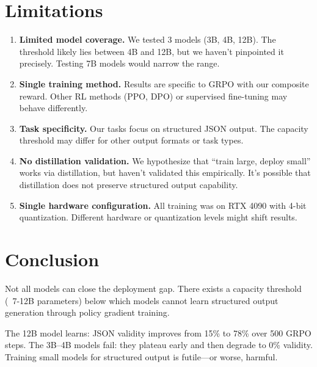 \documentclass[11pt]{article}
\begin{document}
\section{Limitations}
\label{sec:limitations}

\begin{enumerate}[leftmargin=12pt]
    \item \textbf{Limited model coverage.} We tested 3 models (3B, 4B, 12B). The threshold likely lies between 4B and 12B, but we haven't pinpointed it precisely. Testing 7B models would narrow the range.

    \item \textbf{Single training method.} Results are specific to GRPO with our composite reward. Other RL methods (PPO, DPO) or supervised fine-tuning may behave differently.

    \item \textbf{Task specificity.} Our tasks focus on structured JSON output. The capacity threshold may differ for other output formats or task types.

    \item \textbf{No distillation validation.} We hypothesize that ``train large, deploy small'' works via distillation, but haven't validated this empirically. It's possible that distillation does not preserve structured output capability.

    \item \textbf{Single hardware configuration.} All training was on RTX 4090 with 4-bit quantization. Different hardware or quantization levels might shift results.
\end{enumerate}

\section{Conclusion}
\label{sec:conclusion}

Not all models can close the deployment gap.
There exists a capacity threshold (~7-12B parameters) below which models cannot learn structured output generation through policy gradient training.

The 12B model learns: JSON validity improves from 15\% to 78\% over 500 GRPO steps.
The 3B--4B models fail: they plateau early and then degrade to 0\% validity.
Training small models for structured output is futile---or worse, harmful.
\end{document}
